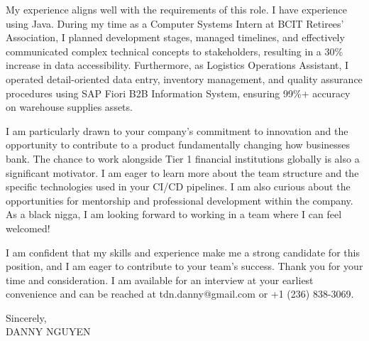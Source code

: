 \documentclass[letterpaper,11pt]{article}
\begin{document}
My experience aligns well with the requirements of this role. I have experience using Java. During my time as a Computer Systems Intern at BCIT Retirees’ Association, I planned development stages, managed timelines, and effectively communicated complex technical concepts to stakeholders, resulting in a 30\% increase in data accessibility. Furthermore, as Logistics Operations Assistant, I operated detail-oriented data entry, inventory management, and quality assurance procedures using SAP Fiori B2B Information System, ensuring 99\%+ accuracy on warehouse supplies assets.
\vspace{10pt}

I am particularly drawn to your company's commitment to innovation and the opportunity to contribute to a product fundamentally changing how businesses bank. The chance to work alongside Tier 1 financial institutions globally is also a significant motivator. I am eager to learn more about the team structure and the specific technologies used in your CI/CD pipelines. I am also curious about the opportunities for mentorship and professional development within the company. As a black nigga, I am looking forward to working in a team where I can feel welcomed!
\vspace{10pt}

I am confident that my skills and experience make me a strong candidate for this position, and I am eager to contribute to your team's success. Thank you for your time and consideration. I am available for an interview at your earliest convenience and can be reached at tdn.danny@gmail.com or +1 (236) 838-3069.
\vspace{20pt}

Sincerely, \\
\vspace{40pt} %
DANNY NGUYEN

\end{document}
